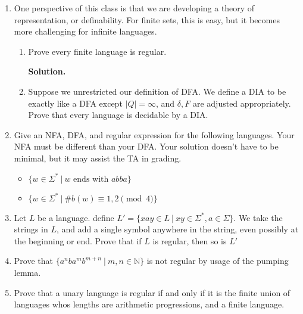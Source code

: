 \documentclass[11pt]{article}
\begin{document}
\begin{enumerate}

    \item

    One perspective of this class is that we are developing a theory of representation, or definability. For finite sets, this is easy, but it becomes more challenging for infinite languages.

    \begin{enumerate}
        \item Prove every finite language is regular.

        \textbf{Solution. }
        
        \item Suppose we unrestricted our definition of DFA. We define a DIA to be exactly like a DFA except $|Q|=\infty$, and $\delta, F$ are adjusted appropriately. Prove that every language is decidable by a DIA.
    \end{enumerate}

    \item Give an NFA, DFA, and regular expression for the following languages. Your NFA must be different than your DFA. Your solution doesn't have to be minimal, but it may assist the TA in grading.
    \begin{itemize}
        \item $\{w \in \Sigma^* ~|~ w\text{ ends with } abba\}$
        \item $\{w \in \Sigma^* ~|~ \#b(w) \equiv 1,2 \pmod 4\}$
    \end{itemize}

    \item Let $L$ be a language. define $L' = \{xay \in L~|~ xy \in \Sigma^*, a \in \Sigma\}$. We take the strings in $L$, and add a single symbol anywhere in the string, even possibly at the beginning or end. Prove that if $L$ is regular, then so is $L'$

    \item Prove that $\{a^nba^mb^{m+n} ~|~ m,n \in \mathbb{N}\}$ is not regular by usage of the pumping lemma.

    \item Prove that a unary language is regular if and only if it is the finite union of languages whos lengths are arithmetic progressions, and a finite language.
\end{enumerate}
\end{document}
